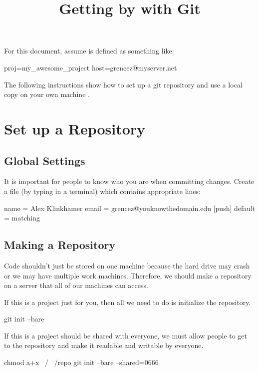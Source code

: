 
\title{Getting by with Git}
\date{}



\tableofcontents

For this document, assume  is defined as something like:
\begin{code}
proj=my_awesome_project
host=grencez@myserver.net
\end{code}
The following instructions show how to set up a git repository  and use a local copy on your own machine .

\section{Set up a Repository}

\subsection{Global Settings}
It is important for people to know who you are when committing changes.
Create a file  (by typing  in a terminal) which contains appropriate lines:
\begin{code}
[user]
  name = Alex Klinkhamer
  email = grencez@youknowthedomain.edu
[push]
  default = matching
\end{code}

\subsection{Making a Repository}

Code shouldn't just be stored on one machine because the hard drive may crash or we may have multiple work machines.
Therefore, we should make a repository on a server that all of our machines can access.

If this is a project just for you, then all we need to do is initialize the repository.
\begin{code}
git init --bare
\end{code}

If this is a project should be shared with everyone, we must allow people to get to the repository and make it readable and writable by everyone.
\begin{code}
chmod a+x ~/ ~/repo
git init --bare --shared=0666
\end{code}

